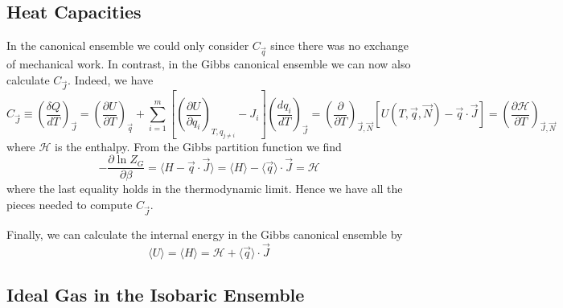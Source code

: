 \documentclass[12pt, a4paper, oneside, openright, titlepage]{book}
\begin{document}
\subsection{Heat Capacities}

In the canonical ensemble we could only consider $C_{\vec{q}}$ since there was no exchange of mechanical work. In contrast, in the Gibbs canonical ensemble we can now also calculate $C_{\vec{J}}$. Indeed, we have \begin{equation*}
    C_{\vec{J}} \equiv \left(\frac{\delta Q}{dT}\right)_{\vec{J}} = \left(\frac{\partial U}{\partial T}\right)_{\vec{q}} + \sum_{i=1}^m\left[\left(\frac{\partial U}{\partial q_i}\right)_{T,q_{j\neq i}} - J_i\right]\left(\frac{dq_i}{dT}\right)_{\vec{J}} = \left(\frac{\partial}{\partial T}\right)_{\vec{J},\vec{N}}\left[U(T,\vec{q},\vec{N}) - \vec{q}\cdot \vec{J}\right] = \left(\frac{\partial \mathcal{H}}{\partial T}\right)_{\vec{J},\vec{N}}
\end{equation*}
where $\mathcal{H}$ is the enthalpy. From the Gibbs partition function we find \begin{equation*}
    -\frac{\partial \ln Z_G}{\partial \beta} = \langle H-\vec{q}\cdot\vec{J}\rangle = \langle H\rangle - \langle \vec{q}\rangle \cdot\vec{J} = \mathcal{H}
\end{equation*}
where the last equality holds in the thermodynamic limit. Hence we have all the pieces needed to compute $C_{\vec{J}}$.

Finally, we can calculate the internal energy in the Gibbs canonical ensemble by \begin{equation*}
    \langle U\rangle = \langle H\rangle = \mathcal{H} + \langle \vec{q}\rangle \cdot \vec{J}
\end{equation*}


\subsection{Ideal Gas in the Isobaric Ensemble}
\end{document}
